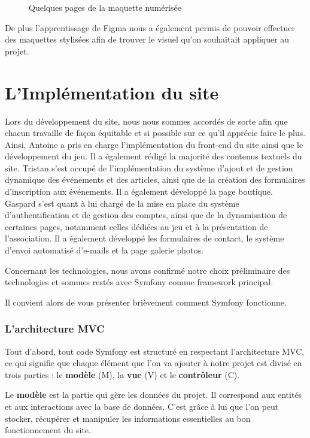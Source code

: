 \begin{figure}[H]
    \caption{Quelques pages de la maquette numérisée}
    \label{fig:enter-label}
\end{figure}

De plus l'apprentissage de Figma nous a également permis de pouvoir effectuer des maquettes stylisées afin de trouver le visuel qu'on souhaitait appliquer au projet.



\section{L'Implémentation du site}

Lors du développement du site, nous nous sommes accordés de sorte afin que chacun travaille de façon équitable et si possible sur ce qu'il apprécie faire le plus. 
Ainsi, Antoine a pris en charge l’implémentation du front-end du site ainsi que le développement du jeu. Il a également rédigé la majorité des contenus textuels du site.  
Tristan s’est occupé de l’implémentation du système d’ajout et de gestion dynamique des événements et des articles, ainsi que de la création des formulaires d’inscription aux événements. Il a également développé la page boutique.  
Gaspard s’est quant à lui chargé de la mise en place du système d’authentification et de gestion des comptes, ainsi que de la dynamisation de certaines pages, notamment celles dédiées au jeu et à la présentation de l’association. Il a également développé les formulaires de contact, le système d’envoi automatisé d’e-mails et la page galerie photos.

Concernant les technologies, nous avons confirmé notre choix préliminaire des technologies et sommes restés avec Symfony comme framework principal.

Il convient alors de vous présenter brièvement comment Symfony fonctionne.

\subsubsection*{L'architecture MVC}

Tout d'abord, tout code Symfony est structuré en respectant l'architecture MVC, ce qui signifie que chaque élément que l'on va ajouter à notre projet est divisé en trois parties : le \textbf{modèle} (M), la \textbf{vue} (V) et le \textbf{contrôleur} (C). 

Le \textbf{modèle} est la partie qui gère les données du projet. Il correspond aux entités et aux interactions avec la base de données. C’est grâce à lui que l’on peut stocker, récupérer et manipuler les informations essentielles au bon fonctionnement du site.

